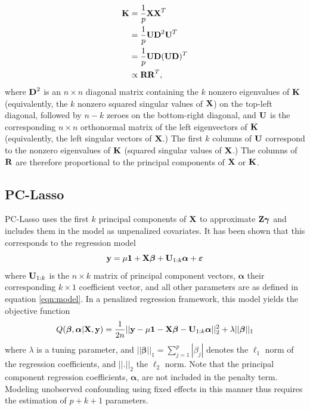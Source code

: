 \begin{align}
    \label{eqn:k}
    \textbf{K} &= \frac{1}{p} \textbf{X} \textbf{X}^T \nonumber \\
                   &= \frac{1}{p} \textbf{U} \textbf{D}^2 \textbf{U}^T \nonumber \\
                   &= \frac{1}{p} \textbf{U} \textbf{D} (\textbf{U} \textbf{D})^T \nonumber \\
                   &\propto \textbf{R} \textbf{R}^T,
\end{align}
where $\textbf{D}^2$ is an $n \times n$ diagonal matrix containing the $k$ nonzero eigenvalues of $\textbf{K}$ (equivalently, the $k$ nonzero squared singular values of $\textbf{X}$) on the top-left diagonal, followed by $n - k$ zeroes on the bottom-right diagonal, and $\textbf{U}$ is the corresponding $n \times n$ orthonormal matrix of the left eigenvectors of $\textbf{K}$ (equivalently, the left singular vectors of $\textbf{X}$.) The first $k$ columns of $\textbf{U}$ correspond to the nonzero eigenvalues of $\textbf{K}$ (squared singular values of $\textbf{X}$.) The columns of $\textbf{R}$ are therefore proportional to the principal components of $\textbf{X}$ or $\textbf{K}$. 

\subsection{PC-Lasso}
PC-Lasso uses the first $k$ principal components of $\textbf{X}$ to approximate $\textbf{Z}\boldsymbol{\gamma}$ and includes them in the model as unpenalized covariates. It has been shown \citep{hoffman2013correcting} that this corresponds to the regression model
\begin{equation}
    \label{eqn:pca_reg}
    \textbf{y} = \mu \textbf{1} + \textbf{X}\boldsymbol{\beta} + \textbf{U}_{1:k}\boldsymbol{\alpha} + \boldsymbol{\varepsilon} 
\end{equation}
where $\textbf{U}_{1:k}$ is the $n \times k$ matrix of principal component vectors, $\boldsymbol{\alpha}$ their corresponding $k \times 1$ coefficient vector, and all other parameters are as defined in equation \eqref{eqn:model}. In a penalized regression framework, this model yields the objective function
\begin{equation}
    \label{eqn:pca_obj}
    Q(\boldsymbol{\beta}, \boldsymbol{\alpha}|\textbf{X}, \textbf{y}) = \frac{1}{2n} ||\textbf{y} - \mu \textbf{1} - \textbf{X} \boldsymbol{\beta}- \textbf{U}_{1:k}\boldsymbol{\alpha}||_2^2 + \lambda || \boldsymbol{\beta} ||_1
\end{equation}
where $\lambda$ is a tuning parameter, and $|| \boldsymbol{\beta} ||_1 = \sum_{j=1}^p |\beta_j|$ denotes the $\ell_1$ norm of the regression coefficients, and $||.||_2$ the $\ell_2$ norm. Note that the principal component regression coefficients, $\boldsymbol{\alpha}$, are not included in the penalty term. Modeling unobserved confounding using fixed effects in this manner thus requires the estimation of $p + k + 1$ parameters. 


